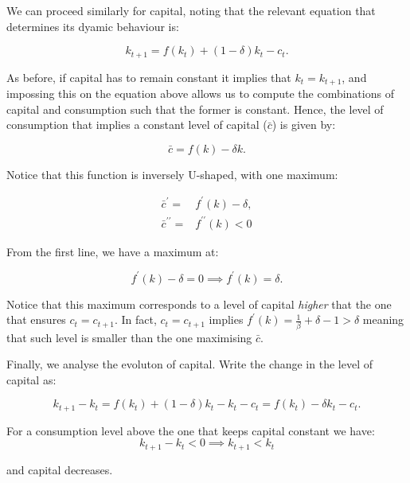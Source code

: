 \documentclass[11pt,a4paper,english]{article}
\begin{document}
We can proceed similarly for capital, noting that the relevant equation that determines its dyamic behaviour is:

\begin{equation*}
    k_{t+1} = f(k_t) + (1-\delta)k_t - c_t.
\end{equation*}

As before, if capital has to remain constant it implies that $k_t = k_{t+1}$, and impossing this on the equation above allows us to compute the combinations of capital and consumption such that the former is constant.
Hence, the level of consumption that implies a constant level of capital ($\bar{c}$) is given by:

\begin{equation*}
    \bar{c} = f(k) - \delta k.
\end{equation*}

Notice that this function is inversely U-shaped, with one maximum:

\begin{align*}
    \bar{c}^\prime =& f^\prime(k) - \delta, \\
    \bar{c}^{\prime \prime} =& f^{\prime \prime}(k) < 0
\end{align*}

From the first line, we have a maximum at:

\begin{equation*}
    f^\prime(k) - \delta = 0 \implies f^\prime(k) = \delta.
\end{equation*}

Notice that this maximum corresponds to a level of capital \emph{higher} that the one that ensures $c_t = c_{t+1}.$
In fact, $c_t = c_{t+1}$ implies $f^\prime(k) = \frac{1}{\beta}+\delta-1 > \delta$ meaning that such level is smaller than the one maximising $\bar{c}.$

Finally, we analyse the evoluton of capital.
Write the change in the level of capital as:

\begin{equation*}
    k_{t+1} - k_t = f(k_t) + (1-\delta)k_t - k_t - c_t = f(k_t) - \delta k_t -c_t.
\end{equation*}

For a consumption level above the one that keeps capital constant we  have:
\begin{equation*}
    k_{t+1} - k_t < 0 \implies k_{t+1} < k_t
\end{equation*}

and capital decreases.
\end{document}
